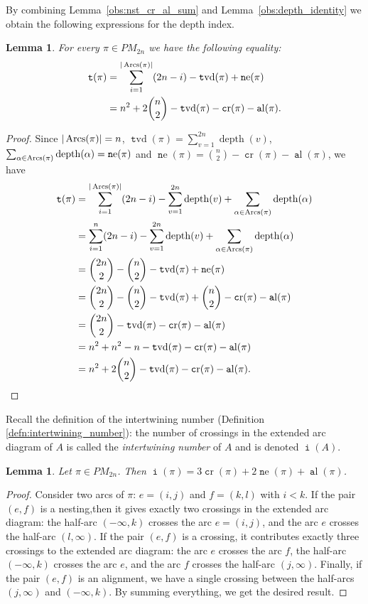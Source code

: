 \documentclass[11pt]{amsart}
\numberwithin{figure}{section}
\DeclareMathOperator{\depth}{depth}
\DeclareMathOperator{\arcs}{\text Arcs}
\DeclareMathOperator{\inumber}{\mathtt i}
\DeclareMathOperator{\dindex}{\mathtt t}
\DeclareMathOperator{\cro}{\mathtt cr}
\DeclareMathOperator{\nst}{\mathtt ne}
\DeclareMathOperator{\al}{\mathtt al}
\DeclareMathOperator{\tvd}{\mathtt tvd}
\theoremstyle{plain}
\newtheorem{lemma}[theorem]{Lemma}
\theoremstyle{definition}
\begin{document}
By combining Lemma~\ref{obs:nst_cr_al_sum} and Lemma~\ref{obs:depth_identity} we obtain the following expressions for the depth index.
\begin{lemma}\label{obs:depth-index-restatement}
	For every $\pi\in PM_{2n}$ we have the following equality:
	\begin{align*}
	\dindex(\pi) 
		&= \sum_{i=1}^{|\arcs(\pi)|}(2n-i) - \tvd(\pi) + \nst(\pi) \\
		&= n^2 + 2\binom{n}{2} - \tvd(\pi) - \cro(\pi) - \al(\pi).		  
	\end{align*}
\end{lemma}
\begin{proof} Since $|\arcs(\pi)|=n$, $\tvd(\pi)=\sum_{v=1}^{2n} \depth(v)$, $\sum_{\alpha \in \arcs(\pi)} \depth(\alpha)=\nst(\pi)$ and $\nst(\pi)=\binom{n}{2}-\cro(\pi)-\al(\pi)$, we have
\begin{align*}  
\dindex(\pi)&=\sum_{i=1}^{|\arcs(\pi)|}(2n-i)-\sum_{v=1}^{2n} \depth(v) + \sum_{\alpha \in \arcs(\pi)} \depth(\alpha) \\
&=\sum_{i=1}^{n}(2n-i)-\sum_{v=1}^{2n} \depth(v) + \sum_{\alpha \in \arcs(\pi)} \depth(\alpha) \\
&=\binom{2n}{2}-\binom{n}{2}-\tvd(\pi)+\nst(\pi) \\
&=\binom{2n}{2}-\binom{n}{2}-\tvd(\pi)+\binom{n}{2}-\cro(\pi)-\al(\pi) \\
&=\binom{2n}{2}-\tvd(\pi)-\cro(\pi)-\al(\pi) \\
&=n^2+n^2-n-\tvd(\pi)-\cro(\pi)-\al(\pi) \\
&= n^2 + 2\binom{n}{2} - \tvd(\pi) - \cro(\pi) - \al(\pi).
\end{align*}
\end{proof}


Recall the definition of the intertwining number (Definition \ref{defn:intertwining_number}): the number of crossings in the extended arc diagram of $A$ is called the {\em intertwining number} of $A$ and is denoted $\inumber(A)$.
\begin{lemma}\label{lemma:intertwining_number_restatement}
Let $\pi\in PM_{2n}$. Then $\inumber(\pi) = 3\cro(\pi) + 2\nst(\pi) + \al(\pi)$.
\end{lemma}
\begin{proof}
	Consider two arcs of $\pi$: $e=(i,j)$ and $f=(k,l)$ with $i < k$.
	If the pair $(e,f)$ is a nesting,then it gives exactly two crossings in the extended arc diagram: the half-arc $(-\infty,k)$ crosses the arc $e=(i, j)$, and the arc $e$ crosses the half-arc $(l,\infty)$.
	If the pair $(e,f)$ is a crossing, it contributes exactly three crossings to the extended arc diagram: the arc $e$ crosses the arc $f$, the half-arc $(-\infty,k)$ crosses the arc $e$, and the arc $f$ crosses the half-arc $(j,\infty)$. Finally, if the pair $(e,f)$ is an alignment, we have a single crossing between the half-arcs $(j,\infty)$ and $(-\infty, k)$.
	By summing everything, we get the desired result.
\end{proof}
\end{document}
